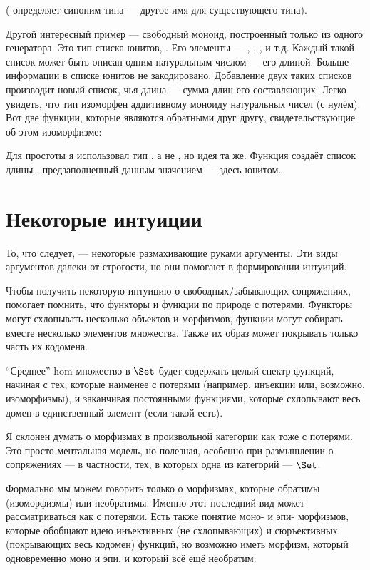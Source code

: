 ( определяет синоним типа --- другое имя для существующего
типа).

Другой интересный пример --- свободный моноид, построенный только из одного
генератора. Это тип списка юнитов, \code{{[}(){]}}. Его
элементы --- \code{{[}{]}}, \code{{[}(){]}}, \code{{[}(), (){]}},
и т.д. Каждый такой список может быть описан одним натуральным числом --- его
длиной. Больше информации в списке юнитов не закодировано.
Добавление двух таких списков производит новый список, чья длина --- сумма
длин его составляющих. Легко увидеть, что тип
\code{{[}(){]}} изоморфен аддитивному моноиду натуральных
чисел (с нулём). Вот две функции, которые являются обратными
друг другу, свидетельствующие об этом изоморфизме:

Для простоты я использовал тип , а не
, но идея та же. Функция
 создаёт список длины , предзаполненный данным
значением --- здесь юнитом.

\section{Некоторые интуиции}

То, что следует, --- некоторые размахивающие руками аргументы. Эти виды аргументов
далеки от строгости, но они помогают в формировании интуиций.

Чтобы получить некоторую интуицию о свободных/забывающих сопряжениях, помогает
помнить, что функторы и функции по природе с потерями. Функторы
могут схлопывать несколько объектов и морфизмов, функции могут собирать вместе
несколько элементов множества. Также их образ может покрывать только
часть их кодомена.

``Среднее'' hom-множество в $\Set$ будет содержать целый спектр
функций, начиная с тех, которые наименее с потерями (например, инъекции
или, возможно, изоморфизмы), и заканчивая постоянными функциями, которые
схлопывают весь домен в единственный элемент (если такой есть).

Я склонен думать о морфизмах в произвольной категории как тоже с потерями.
Это просто ментальная модель, но полезная, особенно при
размышлении о сопряжениях --- в частности, тех, в которых одна из
категорий --- $\Set$.

Формально мы можем говорить только о морфизмах, которые обратимы
(изоморфизмы) или необратимы. Именно этот последний вид может рассматриваться
как с потерями. Есть также понятие моно- и эпи- морфизмов,
которые обобщают идею инъективных (не схлопывающих) и сюръективных
(покрывающих весь кодомен) функций, но возможно иметь
морфизм, который одновременно моно и эпи, и который всё ещё необратим.

